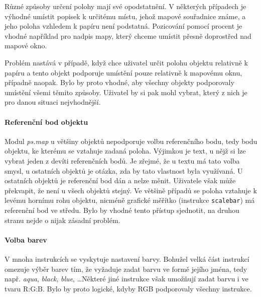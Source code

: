 \documentclass[a4paper,12pt,draft]{article}
\newcommand{\modul}[1]{\emph{#1}}
\newcommand{\instr}[1]{\lstinline[style=psmapInline]|#1|}
\begin{document}
Různé způsoby určení polohy mají své opodstatnění. V některých případech je výhodné umístit popisek k určitému místu, jehož mapové souřadnice známe, a jeho poloha vzhledem k papíru není podstatná. Pozicování pomocí procent je vhodné například pro nadpis mapy, který chceme umístit přesně doprostřed nad mapové okno. 

Problém nastává v případě, když chce uživatel určit polohu objektu relativně k papíru a tento objekt podporuje umístění pouze relativně k mapovému oknu, případně naopak. Bylo by proto vhodné, aby všechny objekty podporovaly umístění všemi těmito způsoby. Uživatel by si pak mohl vybrat, který z nich je pro danou situaci nejvhodnější.

\paragraph*{Referenční bod objektu}
\label{sec:psmap:referencepoint}
Modul \modul{ps.map} u většiny objektů nepodporuje volbu referenčního bodu, tedy bodu objektu, ke kterému se vztahuje zadaná poloha. Výjimkou je text, u nějž si lze vybrat jeden z devíti referenčních bodů. Je zřejmé, že u textu má tato volba smysl, u ostatních objektů je otázka, zda by tato vlastnost byla využívaná. 
U ostatních objektů je referenční bod dán a nelze měnit. Uživatele však může překvapit, že není u všech objektů stejný. Ve většině případů se poloha vztahuje k levému hornímu rohu objektu, nicméně grafické měřítko (instrukce \instr{scalebar}) má referenční bod ve středu. Bylo by vhodné tento přístup sjednotit, na druhou stranu nejde o nijak zásadní problém. 

\paragraph*{Volba barev}
\label{sec:psmap:color}
V mnoha instrukcích se vyskytuje nastavení barvy. Bohužel velká část instrukcí omezuje výběr barev tím, že vyžaduje zadat barvu ve formě jejího jména, tedy např. \emph{aqua}, \emph{black}, \emph{blue}, \ldots Některé jiné instrukce však umožňují zadat barvu i ve tvaru R:G:B. Bylo by proto logické, kdyby RGB podporovaly všechny instrukce.
\end{document}
